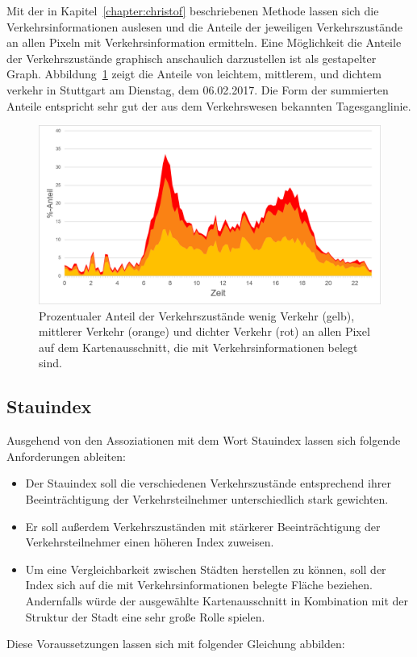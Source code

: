 Mit der in Kapitel~\ref{chapter:christof} beschriebenen Methode lassen sich die Verkehrsinformationen auslesen und die Anteile der jeweiligen Verkehrszustände an allen Pixeln mit Verkehrsinformation ermitteln.
Eine Möglichkeit die Anteile der Verkehrszustände graphisch anschaulich darzustellen ist als gestapelter Graph.
Abbildung~\ref{fig:stacked_stuttgart} zeigt die Anteile von leichtem, mittlerem, und dichtem verkehr in Stuttgart am Dienstag, dem 06.02.2017. Die Form der summierten Anteile entspricht sehr gut der aus dem Verkehrswesen bekannten Tagesganglinie. 
\begin{figure}
  \centering
    \includegraphics[width=1.0\textwidth]{images/stacked_stuttgart.png}
    \caption{Prozentualer Anteil der Verkehrszustände wenig Verkehr (gelb), mittlerer Verkehr (orange) und dichter Verkehr (rot) an allen Pixel auf dem Kartenausschnitt, die mit Verkehrsinformationen belegt sind.}
    \label{fig:stacked_stuttgart}
\end{figure}

\subsection{Stauindex}

Ausgehend von den Assoziationen mit dem Wort Stauindex lassen sich folgende Anforderungen ableiten:
\begin{itemize}
\item Der Stauindex soll die verschiedenen Verkehrszustände entsprechend ihrer Beeinträchtigung der Verkehrsteilnehmer unterschiedlich stark gewichten.
\item Er soll außerdem Verkehrszuständen mit stärkerer Beeinträchtigung der Verkehrsteilnehmer einen höheren Index zuweisen.
\item Um eine Vergleichbarkeit zwischen Städten  herstellen zu können, soll der Index sich auf die mit Verkehrsinformationen belegte Fläche beziehen. Andernfalls würde der ausgewählte Kartenausschnitt in Kombination mit der Struktur der Stadt eine sehr große Rolle spielen. 
\end{itemize}
Diese Voraussetzungen lassen sich mit folgender Gleichung abbilden:

